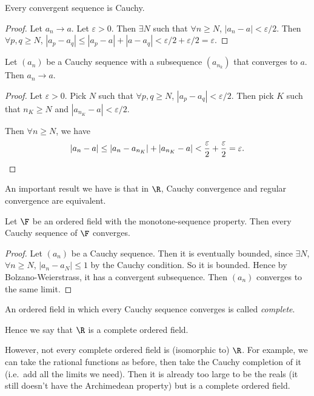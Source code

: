 \documentclass[a4paper]{article}
\begin{document}
\begin{lemma}
  Every convergent sequence is Cauchy.
\end{lemma}

\begin{proof}
  Let $a_n \to a$. Let $\varepsilon > 0$. Then $\exists N$ such that $\forall n \geq N$, $|a_n - a| < \varepsilon/2$. Then $\forall p, q\geq N$, $|a_p - a_q| \leq |a_p - a| + |a - a_q| < \varepsilon/2 + \varepsilon/2 = \varepsilon$.
\end{proof}

\begin{lemma}
  Let $(a_n)$ be a Cauchy sequence with a subsequence $(a_{n_k})$ that converges to $a$. Then $a_n\to a$.
\end{lemma}

\begin{proof}
  Let $\varepsilon > 0$. Pick $N$ such that $\forall p, q\geq N$, $|a_p - a_q| < \varepsilon/2$. Then pick $K$ such that $n_K \geq N$ and $|a_{n_K} - a| < \varepsilon/2$.

  Then $\forall n \geq N$, we have
  \[
    |a_n - a| \leq |a_n - a_{n_K}| + |a_{n_K} - a| < \frac{\varepsilon}{2} + \frac{\varepsilon}{2} = \varepsilon.\qedhere
  \]
\end{proof}

An important result we have is that in $\R$, Cauchy convergence and regular convergence are equivalent.
\begin{thm}
  Let $\F$ be an ordered field with the monotone-sequence property. Then every Cauchy sequence of $\F$ converges.
\end{thm}

\begin{proof}
Let $(a_n)$ be a Cauchy sequence. Then it is eventually bounded, since $\exists N$, $\forall n \geq N$, $|a_n - a_N| \leq 1$ by the Cauchy condition. So it is bounded. Hence by Bolzano-Weierstrass, it has a convergent subsequence. Then $(a_n)$ converges to the same limit.
\end{proof}

\begin{defi}
  An ordered field in which every Cauchy sequence converges is called \emph{complete}.
\end{defi}

Hence we say that $\R$ is a complete ordered field.

However, not every complete ordered field is (isomorphic to) $\R$. For example, we can take the rational functions as before, then take the Cauchy completion of it (i.e.\ add all the limits we need). Then it is already too large to be the reals (it still doesn't have the Archimedean property) but is a complete ordered field.
\end{document}
